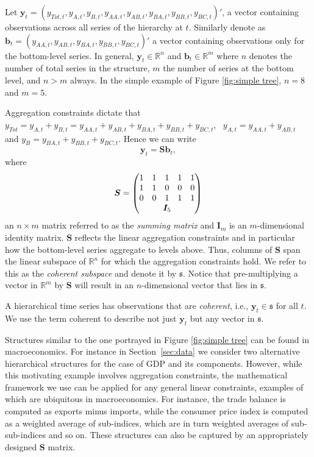 \documentclass[graybox]{svmult}
\begin{document}
Let $\bm{y}_t = (y_{Tot,t},y_{A,t}, y_{B,t},y_{AA,t}, y_{AB,t}, y_{BA,t}, y_{BB,t},y_{BC,t})'$, a vector containing observations across all series of the hierarchy at $t$. Similarly denote as \linebreak $\bm{b}_t = (y_{AA,t}, y_{AB,t}, y_{BA,t}, y_{BB,t}, y_{BC,t})'$ a vector containing observations only for the bottom-level series. In general, $\bm{y}_t\in \mathbb{R}^n$ and $\bm{b}_t \in \mathbb{R}^m$ where $n$ denotes the number of total series in the structure, $m$ the number of series at the bottom level, and $n>m$ always. In the simple example of Figure \ref{fig:simple tree}, $n=8$ and $m=5$.

Aggregation constraints dictate that $y_{Tot}=y_{A,t}+y_{B,t}=y_{AA,t}+y_{AB,t}+y_{BA,t}+y_{BB,t}+y_{BC,t}$,~ $y_{A,t}=y_{AA,t}+y_{AB,t}$ and $y_{B}=y_{BA,t}+y_{BB,t}+y_{BC,t}$. Hence we can write
\begin{equation}\label{eq:summing matrix}
\bm{y}_t = \bm{Sb}_t,
\end{equation}
where \begin{equation*}
\bm{S} = \begin{pmatrix}
1& 1& 1& 1 & 1 \\
1& 1& 0& 0 & 0\\
0& 0& 1& 1 & 1\\
& \multicolumn{3}{c}{\bm{I}_5} &
\end{pmatrix}
\end{equation*}
an $n\times m$ matrix referred to as the \textit{summing matrix} and $\bm{I}_m$ is an $m$-dimensional identity matrix. $\bm{S}$ reflects the linear aggregation constraints and in particular how the bottom-level series aggregate to levels above. Thus, columns of $\bm{S}$ span the linear subspace of $\mathbb{R}^n$ for which the aggregation constraints hold. We refer to this as the \textit{coherent subspace} and denote it by $\mathfrak{s}$. Notice that pre-multiplying a vector in $\mathbb{R}^m$ by $\bm{S}$ will result in an $n$-dimensional vector that lies in $\mathfrak{s}$.

\begin{property}
A hierarchical time series has observations that are \textit{coherent}, i.e., $\bm{y}_{t} \in \mathfrak{s}$ for all $t$. We use the term coherent to describe not just $\bm{y}_t$ but any vector in $\mathfrak{s}$.
  \label{prop:coherence}
\end{property}


Structures similar to the one portrayed in Figure \ref{fig:simple tree} can be found in macroeconomics. For instance in Section~\ref{sec:data} we consider two alternative hierarchical structures for the case of GDP and its components.  However, while this motivating example involves aggregation constraints, the mathematical framework we use can be applied for any general linear constraints, examples of which are ubiquitous in macroeconomics. For instance, the trade balance is computed as exports minus imports, while the consumer price index is computed as a weighted average of sub-indices, which are in turn weighted averages of sub-sub-indices and so on.  These structures can also be captured by an appropriately designed $\bm{S}$ matrix.
\end{document}
